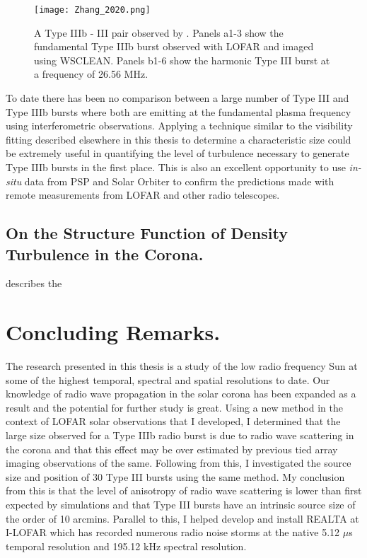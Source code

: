 \begin{figure}[ht]
\centering
\texttt{[image: Zhang\_2020.png]}
\caption[Type IIIb - III pair observed by \cite{Zhang2020}]{A Type IIIb - III pair observed by \cite{Zhang2020}. Panels a1-3 show the fundamental Type IIIb burst observed with LOFAR and imaged using WSCLEAN. Panels b1-6 show the harmonic Type III burst at a frequency of 26.56 MHz.}
\label{fig:typeIIIbIII}
\end{figure}

To date there has been no comparison between a large number of Type III and Type IIIb bursts where both are emitting at the fundamental plasma frequency using interferometric observations. Applying a technique similar to the visibility fitting described elsewhere in this thesis to determine a characteristic size could be extremely useful in quantifying the level of turbulence necessary to generate Type IIIb bursts in the first place. This is also an excellent opportunity to use \textit{in-situ} data from PSP and Solar Orbiter to confirm the predictions made with remote measurements from LOFAR and other radio telescopes. 

\subsection{On the Structure Function of Density Turbulence in the Corona.}
\cite{Bastian1994} describes the

\section{Concluding Remarks.}
The research presented in this thesis is a study of the low radio frequency Sun at some of the highest temporal, spectral and spatial resolutions to date. Our knowledge of radio wave propagation in the solar corona has been expanded as a result and the potential for further study is great. Using a new method in the context of LOFAR solar observations that I developed, I determined that the large size observed for a Type IIIb radio burst is due to radio wave scattering in the corona and that this effect may be over estimated by previous tied array imaging observations of the same. Following from this, I investigated the source size and position of 30 Type III bursts using the same method. My conclusion from this is that the level of anisotropy of radio wave scattering is lower than first expected by simulations and that Type III bursts have an intrinsic source size of the order of 10 arcmins. Parallel to this, I helped develop and install REALTA at I-LOFAR which has recorded numerous radio noise storms at the native 5.12 $\mu$s temporal resolution and 195.12 kHz spectral resolution.

